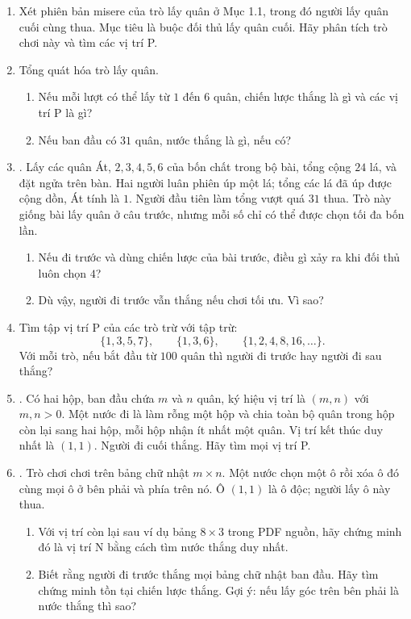 \documentclass[11pt]{article}
\begin{document}
\begin{enumerate}
  \item Xét phiên bản misere của trò lấy quân ở Mục 1.1, trong đó người lấy
  quân cuối cùng thua. Mục tiêu là buộc đối thủ lấy quân cuối. Hãy phân tích
  trò chơi này và tìm các vị trí P.

  \item Tổng quát hóa trò lấy quân.
  \begin{enumerate}
    \item Nếu mỗi lượt có thể lấy từ \(1\) đến \(6\) quân, chiến lược thắng là
    gì và các vị trí P là gì?
    \item Nếu ban đầu có \(31\) quân, nước thắng là gì, nếu có?
  \end{enumerate}

  \item {}. Lấy các quân Át, \(2,3,4,5,6\) của bốn chất trong
  bộ bài, tổng cộng \(24\) lá, và đặt ngửa trên bàn. Hai người luân phiên úp
  một lá; tổng các lá đã úp được cộng dồn, Át tính là \(1\). Người đầu tiên
  làm tổng vượt quá \(31\) thua. Trò này giống bài lấy quân ở câu trước, nhưng
  mỗi số chỉ có thể được chọn tối đa bốn lần.
  \begin{enumerate}
    \item Nếu đi trước và dùng chiến lược của bài trước, điều gì xảy ra khi
    đối thủ luôn chọn \(4\)?
    \item Dù vậy, người đi trước vẫn thắng nếu chơi tối ưu. Vì sao?
  \end{enumerate}

  \item Tìm tập vị trí P của các trò trừ với tập trừ:
  \[
    \{1,3,5,7\},\qquad \{1,3,6\},\qquad
    \{1,2,4,8,16,\ldots\}.
  \]
  Với mỗi trò, nếu bắt đầu từ \(100\) quân thì người đi trước hay người đi sau
  thắng?

  \item {}. Có hai hộp, ban đầu chứa \(m\) và \(n\) quân,
  ký hiệu vị trí là \((m,n)\) với \(m,n>0\). Một nước đi là làm rỗng một hộp
  và chia toàn bộ quân trong hộp còn lại sang hai hộp, mỗi hộp nhận ít nhất
  một quân. Vị trí kết thúc duy nhất là \((1,1)\). Người đi cuối thắng. Hãy
  tìm mọi vị trí P.

  \item {}. Trò chơi chơi trên bảng chữ nhật \(m\times n\). Một nước
  chọn một ô rồi xóa ô đó cùng mọi ô ở bên phải và phía trên nó. Ô \((1,1)\)
  là ô độc; người lấy ô này thua.
  \begin{enumerate}
    \item Với vị trí còn lại sau ví dụ bảng \(8\times3\) trong PDF nguồn, hãy
    chứng minh đó là vị trí N bằng cách tìm nước thắng duy nhất.
    \item Biết rằng người đi trước thắng mọi bảng chữ nhật ban đầu. Hãy tìm
    chứng minh tồn tại chiến lược thắng. Gợi ý: nếu lấy góc trên bên phải là
    nước thắng thì sao?
  \end{enumerate}


\end{enumerate}
\end{document}
